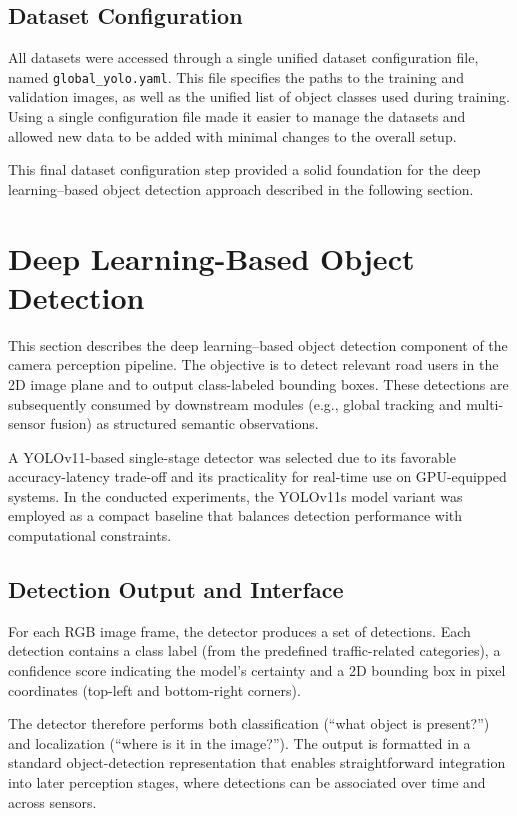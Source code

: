 \documentclass[12pt,a4paper]{report}
\begin{document}
\subsection{Dataset Configuration}
All datasets were accessed through a single unified dataset configuration file, named \texttt{global\_yolo.yaml}. This file specifies the paths to the training and validation images, as well as the unified list of object classes used during training. Using a single configuration file made it easier to manage the datasets and allowed new data to be added with minimal changes to the overall setup.

This final dataset configuration step provided a solid foundation for the deep learning–based object detection approach described in the following section.


\section{Deep Learning-Based Object Detection}
This section describes the deep learning–based object detection component of the camera perception pipeline. The objective is to detect relevant road users in the 2D image plane and to output class-labeled bounding boxes. These detections are subsequently consumed by downstream modules (e.g., global tracking and multi-sensor fusion) as structured semantic observations.

A YOLOv11-based single-stage detector was selected due to its favorable accuracy-latency trade-off and its practicality for real-time use on GPU-equipped systems. In the conducted experiments, the YOLOv11s model variant was employed as a compact baseline that balances detection performance with computational constraints.

\subsection{Detection Output and Interface}
For each RGB image frame, the detector produces a set of detections. Each detection contains a class label (from the predefined traffic-related categories), a confidence score indicating the model’s certainty and a 2D bounding box in pixel coordinates (top-left and bottom-right corners).

The detector therefore performs both classification (“what object is present?”) and localization (“where is it in the image?”). The output is formatted in a standard object-detection representation that enables straightforward integration into later perception stages, where detections can be associated over time and across sensors.
\end{document}
